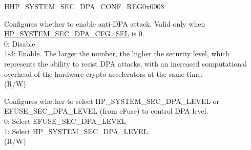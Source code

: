 \begin{register}{H}{HP\_SYSTEM\_SEC\_DPA\_CONF\_REG}{0x0008}\label{regdesc:HPSYSTEMSECDPACONFREG}
%
%
%
\regnewline%
\begin{regdesc}\begin{reglist}
\label{fielddesc:HPSYSTEMSECDPALEVEL}\item [HP\_SYSTEM\_SEC\_DPA\_LEVEL] Configures whether to enable anti-DPA attack. Valid only when \hyperref[fielddesc:HPSYSTEMSECDPACFGSEL]{HP\_SYSTEM\_SEC\_DPA\_CFG\_SEL} is 0. \\
0: Disable\\
1-3: Enable. The larger the number, the higher the security level, which represents the ability to resist DPA attacks, with an increased computational overhead of the hardware crypto-accelerators at the same time. \\
(R/W)
\label{fielddesc:HPSYSTEMSECDPACFGSEL}\item [HP\_SYSTEM\_SEC\_DPA\_CFG\_SEL] Configures whether to select HP\_SYSTEM\_SEC\_DPA\_LEVEL or EFUSE\_SEC\_DPA\_LEVEL (from eFuse) to control DPA level. \\
0: Select EFUSE\_SEC\_DPA\_LEVEL\\
1: Select HP\_SYSTEM\_SEC\_DPA\_LEVEL\\
(R/W)
\end{reglist}\end{regdesc}
\end{register}










